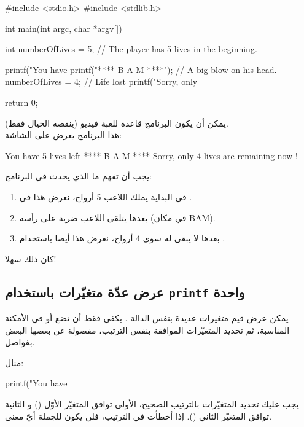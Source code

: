 \begin{Csource}
#include <stdio.h>
#include <stdlib.h>

int main(int argc, char *argv[])
{
  int numberOfLives = 5; // The player has 5 lives in the beginning.

  printf("You have %
  printf("**** B A M ****\n"); // A big blow on his head.
  numberOfLives = 4; // Life lost
  printf("Sorry, only %

  return 0;
}
\end{Csource}

يمكن أن يكون البرنامج قاعدة للعبة فيديو (ينقصه الخيال فقط).\\
هذا البرنامج يعرض على الشاشة:

\begin{Console}
You have 5 lives left
**** B A M ****
Sorry, only 4 lives are remaining now !

\end{Console}

يجب أن تفهم ما الذي يحدث في البرنامج:

\begin{enumerate}
  \item في البداية يملك اللاعب 5 أرواح، نعرض هذا في
.
  \item  بعدها يتلقى اللاعب ضربة على رأسه (في مكان
\textenglish{BAM}).
  \item بعدها لا يبقى له سوى 4 أرواح، نعرض هذا أيضا باستخدام
.
\end{enumerate}

كان ذلك سهلا!

\subsection{عرض عدّة متغيّرات باستخدام \texttt{printf} واحدة}

يمكن عرض قيم متغيرات عديدة بنفس الدالة
.
يكفي فقط أن تضع
أو
 في الأمكنة المناسبة، ثم تحديد المتغيّرات الموافقة بنفس الترتيب، مفصولة عن بعضها البعض بفواصل.

مثال:

\begin{Csource}
printf("You have %
\end{Csource}

\begin{warning}
  يجب عليك تحديد المتغيّرات بالترتيب الصحيح،
الأولى توافق المتغيّر الأوّل
()
و
الثانية توافق المتغيّر الثاني
().
إذا أخطأت في الترتيب، فلن يكون للجملة أيّ معنى.
\end{warning}

